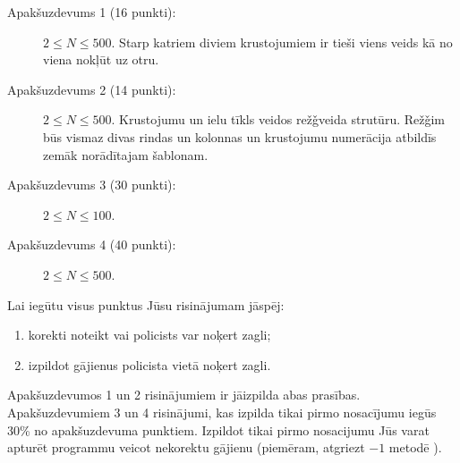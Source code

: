 \documentclass{boi2014-lv}
\begin{document}
    \Scoring

    \begin{description}
        \item[Apakšuzdevums 1 (16 punkti):] $2 \le N \le 500$. Starp katriem diviem krustojumiem ir tieši viens veids kā no viena nokļūt uz otru.%
        \item[Apakšuzdevums 2 (14 punkti):] $2 \le N \le 500$.  Krustojumu un ielu tīkls veidos rež\v{g}veida strutūru. Rež\v{g}im būs vismaz divas rindas un kolonnas un krustojumu numerācija atbildīs zemāk norādītajam šablonam.
        \begin{figure}[h!]
           \centering
        \end{figure}
        \item[Apakšuzdevums 3 (30 punkti):] $2 \le N \le 100$.
        \item[Apakšuzdevums 4 (40 punkti):] $2 \le N \le 500$.
    \end{description}

	Lai iegūtu visus punktus Jūsu risinājumam jāspēj:
    \begin{enumerate}
    	\item korekti noteikt vai policists var noķert zagli;%
	\item izpildot gājienus policista vietā noķert zagli.%
    \end{enumerate}
    	Apakšuzdevumos 1 un 2 risinājumiem ir jāizpilda abas prasības.
	Apakšuzdevumiem 3 un 4 risinājumi, kas izpilda tikai pirmo nosacījumu iegūs 30\% no apakšuzdevuma punktiem. Izpildot tikai pirmo nosacijumu Jūs  varat apturēt programmu veicot nekorektu gājienu (piemēram, atgriezt $-1$ metodē ). 
\end{document}
